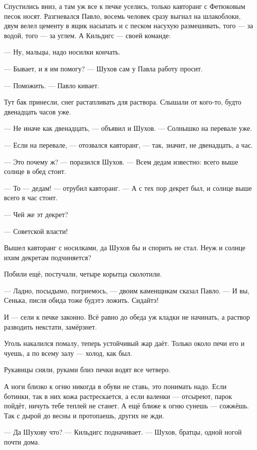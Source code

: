 Спустились вниз, а там уж все к печке уселись, только кавторанг с Фетюковым песок носят. 
Разгневался Павло, восемь человек сразу выгнал на шлакоблоки, двум велел цементу в ящик 
насыпать и с песком насухую размешивать, того --- за водой, того --- за углем. А Кильдигс --- своей 
команде:

--- Ну, мальцы, надо носилки кончать.

--- Бывает, и я им помогу? --- Шухов сам у Павла работу просит.

--- Поможить. --- Павло кивает.

Тут бак принесли, снег растапливать для раствора. Слышали от кого-то, будто двенадцать часов 
уже.

--- Не иначе как двенадцать, --- объявил и Шухов. --- Солнышко на перевале уже.

--- Если на перевале, --- отозвался кавторанг, --- так, значит, не двенадцать, а час.

--- Это почему ж? --- поразился Шухов. --- Всем дедам известно: всего выше солнце в обед стоит.

--- То --- дедам! --- отрубил кавторанг. --- А с тех пор декрет был, и солнце выше всего в час стоит.

--- Чей же эт декрет?

--- Советской власти!

Вышел кавторанг с носилками, да Шухов бы и спорить не стал. Неуж и солнце ихим декретам 
подчиняется?

Побили ещё, постучали, четыре корытца сколотили.

--- Ладно, посыдымо, погриемось, --- двоим каменщикам сказал Павло. --- И вы, Сенька, писля обида 
тоже будэтэ ложить. Сидайтэ!

И --- сели к печке законно. Всё равно до обеда уж кладки не начинать, а раствор разводить 
некстати, замёрзнет.

Уголь накалился помалу, теперь устойчивый жар даёт. Только около печи его и чуешь, а по всему 
залу --- холод, как был.

Рукавицы сняли, руками близ печки водят все четверо.

А ноги близко к огню никогда в обуви не ставь, это понимать надо. Если ботинки, так в них кожа 
растрескается, а если валенки --- отсыреют, парок пойдёт, ничуть тебе теплей не станет. А ещё 
ближе к огню сунешь --- сожжёшь. Так с дырой до весны и протопаешь, других не жди.

--- Да Шухову что? --- Кильдигс подначивает. --- Шухов, братцы, одной ногой почти дома.

